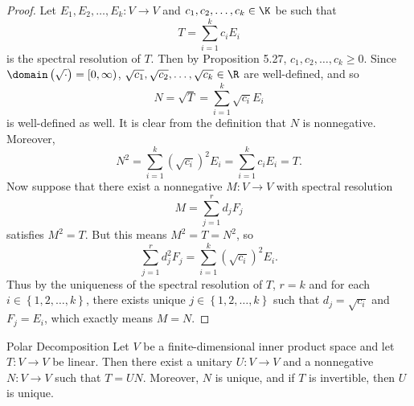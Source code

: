 \documentclass[linearalgebraII]{subfiles}
\begin{document}
    \begin{proof}
        Let $E_1,E_2,\ldots,E_k:V\to V$ and $c_1,c_2,\ldots,c_k\in\K$ be such that
        \begin{equation*}
            T = \sum^{k}_{i=1} c_iE_i
        \end{equation*}
        is the spectral resolution of $T$. Then by Proposition 5.27, $c_1,c_2,\ldots,c_k\geq 0$. Since $\domain\left( \sqrt{\cdot} \right) = [0,\infty)$, $\sqrt{c_1}, \sqrt{c_2}, \ldots, \sqrt{c_k}\in\R$ are well-defined, and so
        \begin{equation*}
            N = \sqrt{T} = \sum^{k}_{i=1} \sqrt{c_i}E_i
        \end{equation*}
        is well-defined as well. It is clear from the definition that $N$ is nonnegative. Moreover,
        \begin{equation*}
            N^2 = \sum^{k}_{i=1} \left( \sqrt{c_i} \right) ^2E_i = \sum^{k}_{i=1} c_iE_i = T.
        \end{equation*}
        Now suppose that there exist a nonnegative $M:V\to V$ with spectral resolution
        \begin{equation*}
            M = \sum^{r}_{j=1} d_jF_j
        \end{equation*}
        satisfies $M^2=T$. But this means $M^2 = T = N^2$, so
        \begin{equation*}
            \sum^{r}_{j=1} d_j^2F_j = \sum^{k}_{i=1} \left( \sqrt{c_i} \right) ^2E_i.
        \end{equation*}
        Thus by the uniqueness of the spectral resolution of $T$, $r=k$ and for each $i\in\left\lbrace 1,2,\ldots,k \right\rbrace$, there exists unique $j\in\left\lbrace 1,2,\ldots,k \right\rbrace$ such that $d_j = \sqrt{c_i}$ and $F_j = E_i$, which exactly means $M=N$.
    \end{proof}

    \begin{theorem}{Polar Decomposition}
        Let $V$ be a finite-dimensional inner product space and let $T:V\to V$ be linear. Then there exist a unitary $U:V\to V$ and a nonnegative $N:V\to V$ such that $T = UN$. Moreover, $N$ is unique, and if $T$ is invertible, then $U$ is unique.
    \end{theorem}
\end{document}
